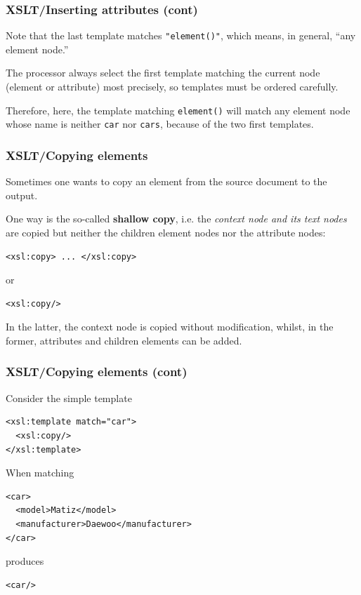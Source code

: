 %
\begin{frame}[containsverbatim]
\frametitle{XSLT/Inserting attributes (cont)}

Note that the last template matches \verb|"element()"|, which means,
in general, ``any element node.''

\bigskip

The \XSLT processor always select the first template matching the
current node (element or attribute) most precisely, so templates must
be ordered carefully.

\bigskip

Therefore, here, the template matching \verb|element()| will match any
element node whose name is neither \texttt{car} nor \texttt{cars},
because of the two first templates.

\end{frame}

%
\begin{frame}[containsverbatim]
\frametitle{XSLT/Copying elements}

Sometimes one wants to copy an element from the source document to the
output.

\bigskip

One way is the so-called \textbf{shallow copy}, i.e. the
\emph{context node and its text nodes} are copied but neither the
children element nodes nor the attribute nodes:
{\small
\begin{verbatim}
<xsl:copy> ... </xsl:copy>
\end{verbatim}
}
or
{\small
\begin{verbatim}
<xsl:copy/>
\end{verbatim}
}
In the latter, the context node is copied without modification,
whilst, in the former, attributes and children elements can be added.

\end{frame}

%
\begin{frame}[containsverbatim]
\frametitle{XSLT/Copying elements (cont)}

Consider the simple template
{\small
\begin{verbatim}
<xsl:template match="car">
  <xsl:copy/>
</xsl:template>
\end{verbatim}
}
When matching
{\small
\begin{verbatim}
<car>
  <model>Matiz</model>
  <manufacturer>Daewoo</manufacturer>
</car>
\end{verbatim}
}
produces
{\small
\begin{verbatim}
<car/>
\end{verbatim}
}

\end{frame}

